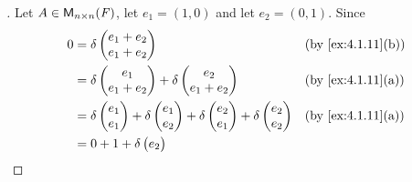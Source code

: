 \begin{proof}[]
	Let \(A \in \ms[n][n][\F]\), let \(e_1 = (1, 0)\) and let \(e_2 = (0, 1)\).
	Since
	\begin{align*}
		0 & = \delta\begin{pmatrix}
			            e_1 + e_2 \\
			            e_1 + e_2
		            \end{pmatrix}               &  & \by{ex:4.1.11}[b]                                                     \\
		  & = \delta\begin{pmatrix}
			            e_1 \\
			            e_1 + e_2
		            \end{pmatrix} + \delta\begin{pmatrix}
			                                  e_2 \\
			                                  e_1 + e_2
		                                  \end{pmatrix} &  & \by{ex:4.1.11}[a]                                             \\
		  & = \delta\begin{pmatrix}
			            e_1 \\
			            e_1
		            \end{pmatrix} + \delta\begin{pmatrix}
			                                  e_1 \\
			                                  e_2
		                                  \end{pmatrix} + \delta\begin{pmatrix}
			                                                        e_2 \\
			                                                        e_1
		                                                        \end{pmatrix} + \delta\begin{pmatrix}
			                                                                              e_2 \\
			                                                                              e_2
		                                                                              \end{pmatrix} &  & \by{ex:4.1.11}[a] \\
		  & = 0 + 1 + \delta\begin{pmatrix}
			                    e_2 \\

\end{pmatrix}
\end{align*}
\end{proof}
